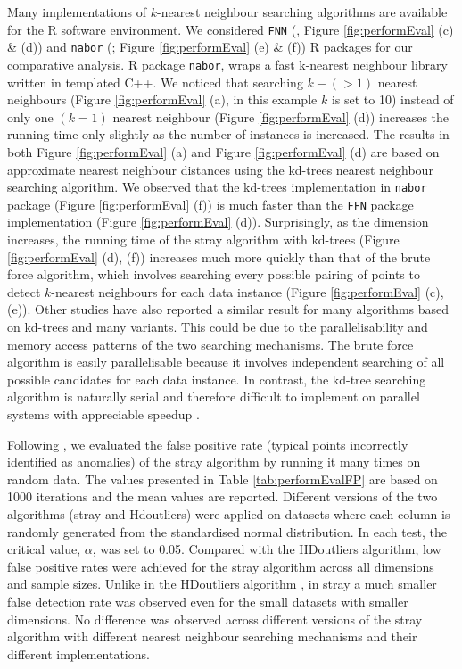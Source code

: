 \documentclass[11pt,a4paper,]{article}
\theoremstyle{definition}
\theoremstyle{definition}
\theoremstyle{definition}
\theoremstyle{remark}
\begin{document}
Many implementations of \(k\)-nearest neighbour searching algorithms are available for the R software environment. We considered \texttt{FNN} (\textcite{FNN2019}, Figure \ref{fig:performEval} (c) \& (d)) and \texttt{nabor} (\textcite{elsebergcomparison}; Figure \ref{fig:performEval} (e) \& (f)) R packages for our comparative analysis. R package \texttt{nabor}, wraps a fast k-nearest neighbour library written in templated C++. We noticed that searching \(k-(>1)\) nearest neighbours (Figure \ref{fig:performEval} (a), in this example \(k\) is set to 10) instead of only one \((k=1)\) nearest neighbour (Figure \ref{fig:performEval} (d)) increases the running time only slightly as the number of instances is increased. The results in both Figure \ref{fig:performEval} (a) and Figure \ref{fig:performEval} (d) are based on approximate nearest neighbour distances using the kd-trees nearest neighbour searching algorithm. We observed that the kd-trees implementation in \texttt{nabor} package (Figure \ref{fig:performEval} (f)) is much faster than the \texttt{FFN} package implementation (Figure \ref{fig:performEval} (d)). Surprisingly, as the dimension increases, the running time of the stray algorithm with kd-trees (Figure \ref{fig:performEval} (d), (f)) increases much more quickly than that of the brute force algorithm, which involves searching every possible pairing of points to detect \(k\)-nearest neighbours for each data instance (Figure \ref{fig:performEval} (c), (e)). Other studies \autocite{kanungo2002efficient} have also reported a similar result for many algorithms based on kd-trees and many variants. This could be due to the parallelisability and memory access patterns of the two searching mechanisms. The brute force algorithm is easily parallelisable because it involves independent searching of all possible candidates for each data instance. In contrast, the kd-tree searching algorithm is naturally serial and therefore difficult to implement on parallel systems with appreciable speedup \autocite{26873}.

Following \autocite{wilkinson2017visualizing}, we evaluated the false positive rate (typical points incorrectly identified as anomalies) of the stray algorithm by running it many times on random data. The values presented in Table \ref{tab:performEvalFP} are based on 1000 iterations and the mean values are reported. Different versions of the two algorithms (stray and Hdoutliers) were applied on datasets where each column is randomly generated from the standardised normal distribution. In each test, the critical value, \(\alpha\), was set to 0.05. Compared with the HDoutliers algorithm, low false positive rates were achieved for the stray algorithm across all dimensions and sample sizes. Unlike in the HDoutliers algorithm \autocite{unwin2019multivariate}, in stray a much smaller false detection rate was observed even for the small datasets with smaller dimensions. No difference was observed across different versions of the stray algorithm with different nearest neighbour searching mechanisms and their different implementations.
\end{document}

